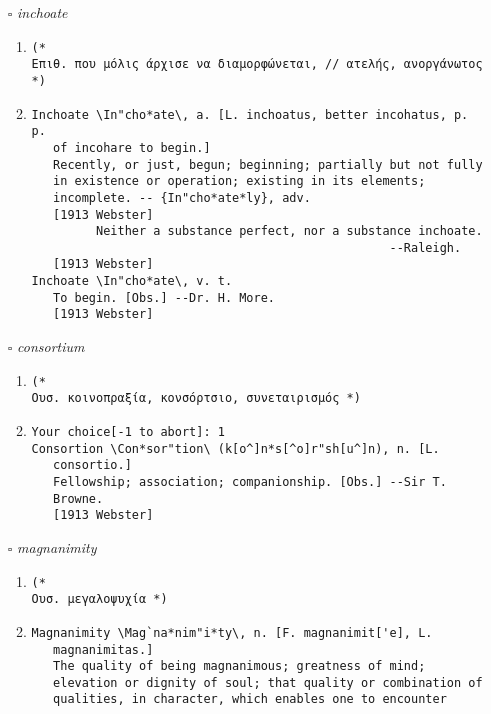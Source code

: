 \documentclass{article}
\begin{document}
\begin{itemize}
\begin{enumerate}
{\begin{lstlisting}
\end{lstlisting}}
\end{enumerate}
\item[$\square$] \emph{ inchoate }
\begin{enumerate}
\item{
\begin{lstlisting}
(* 
Επιθ. που μόλις άρχισε να διαμορφώνεται, // ατελής, ανοργάνωτος *)
\end{lstlisting}}
\item{
\begin{lstlisting}
Inchoate \In"cho*ate\, a. [L. inchoatus, better incohatus, p. p.
   of incohare to begin.]
   Recently, or just, begun; beginning; partially but not fully
   in existence or operation; existing in its elements;
   incomplete. -- {In"cho*ate*ly}, adv.
   [1913 Webster]
         Neither a substance perfect, nor a substance inchoate.
                                                  --Raleigh.
   [1913 Webster]
Inchoate \In"cho*ate\, v. t.
   To begin. [Obs.] --Dr. H. More.
   [1913 Webster]
\end{lstlisting}}
\end{enumerate}
\item[$\square$] \emph{ consortium }
\begin{enumerate}
\item{
\begin{lstlisting}
(* 
Ουσ. κοινοπραξία, κονσόρτσιο, συνεταιρισμός *)
\end{lstlisting}}
\item{
\begin{lstlisting}
Your choice[-1 to abort]: 1
Consortion \Con*sor"tion\ (k[o^]n*s[^o]r"sh[u^]n), n. [L.
   consortio.]
   Fellowship; association; companionship. [Obs.] --Sir T.
   Browne.
   [1913 Webster]
\end{lstlisting}}
\end{enumerate}
\item[$\square$] \emph{ magnanimity }
\begin{enumerate}
\item{
\begin{lstlisting}
(* 
Ουσ. μεγαλοψυχία *)
\end{lstlisting}}
\item{
\begin{lstlisting}
Magnanimity \Mag`na*nim"i*ty\, n. [F. magnanimit['e], L.
   magnanimitas.]
   The quality of being magnanimous; greatness of mind;
   elevation or dignity of soul; that quality or combination of
   qualities, in character, which enables one to encounter

\end{lstlisting}}
\end{enumerate}
\end{itemize}
\end{document}
